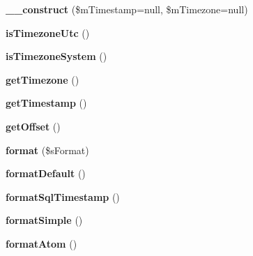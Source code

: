 \begin{DoxyCompactItemize}
\item 
\hypertarget{class_time_affde2381257dcd75efe79147ebd7518c}{{\bfseries \-\_\-\-\_\-construct} (\$m\-Timestamp=null, \$m\-Timezone=null)}\label{class_time_affde2381257dcd75efe79147ebd7518c}

\item 
\hypertarget{class_time_abe286c80a8f5b59596250d6391ce51e2}{{\bfseries is\-Timezone\-Utc} ()}\label{class_time_abe286c80a8f5b59596250d6391ce51e2}

\item 
\hypertarget{class_time_a78f07f7c065004145bd70313b9e1109f}{{\bfseries is\-Timezone\-System} ()}\label{class_time_a78f07f7c065004145bd70313b9e1109f}

\item 
\hypertarget{class_time_a8431e439ea2b71597511bc9e1c4a1386}{{\bfseries get\-Timezone} ()}\label{class_time_a8431e439ea2b71597511bc9e1c4a1386}

\item 
\hypertarget{class_time_ad79687ccae5355f36d02f56e1817049f}{{\bfseries get\-Timestamp} ()}\label{class_time_ad79687ccae5355f36d02f56e1817049f}

\item 
\hypertarget{class_time_a5cee996b1ace58d649f519bc25e3f987}{{\bfseries get\-Offset} ()}\label{class_time_a5cee996b1ace58d649f519bc25e3f987}

\item 
\hypertarget{class_time_a45a7cf4aefcff623d674bc66c5694121}{{\bfseries format} (\$s\-Format)}\label{class_time_a45a7cf4aefcff623d674bc66c5694121}

\item 
\hypertarget{class_time_ab9683485a143c6a3dbe1300b1ca306de}{{\bfseries format\-Default} ()}\label{class_time_ab9683485a143c6a3dbe1300b1ca306de}

\item 
\hypertarget{class_time_acf3f19ffcc0d3798644968c6f177d849}{{\bfseries format\-Sql\-Timestamp} ()}\label{class_time_acf3f19ffcc0d3798644968c6f177d849}

\item 
\hypertarget{class_time_a8ac76c76cf2f3f93b50cf3382c2bbde7}{{\bfseries format\-Simple} ()}\label{class_time_a8ac76c76cf2f3f93b50cf3382c2bbde7}

\item 
\hypertarget{class_time_a6a9970a2f85fd9a355b513176f3f6379}{{\bfseries format\-Atom} ()}\label{class_time_a6a9970a2f85fd9a355b513176f3f6379}


\end{DoxyCompactItemize}

